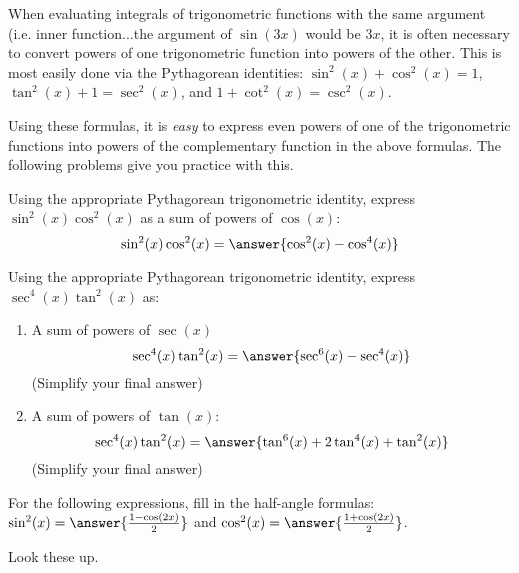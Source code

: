 \documentclass{ximera}
\begin{document}
\begin{problem}
  When evaluating integrals of trigonometric functions with the same argument (i.e. inner function...the argument of $\sin(3x)$ would be $3x$, it is often necessary to convert powers of one trigonometric function into powers of the other.
    This is most easily done via the Pythagorean identities: $\sin^2(x) + \cos^2(x) = 1$, $\tan^2(x) + 1 = \sec^2(x)$, and $1 + \cot^2(x) = \csc^2(x)$.
    
    Using these formulas, it is \emph{easy} to express even powers of one of the trigonometric functions into powers of the complementary function in the above formulas.
    The following problems give you practice with this.
  \begin{multipleChoice}
  \end{multipleChoice}
\end{problem}

\begin{problem}
  Using the appropriate Pythagorean trigonometric identity, express $\sin^2(x) \cos^2(x)$ as a sum of powers of $\cos(x)$:
  \[
    \sin^2(x) \cos^2(x) = \answer{\cos^2(x) - \cos^4(x)}
  \]
\end{problem}

\begin{problem}
  Using the appropriate Pythagorean trigonometric identity, express $\sec^4(x) \tan^2(x)$ as:
  \begin{enumerate}
    \item A sum of powers of $\sec(x)$
      \[
        \sec^4(x) \tan^2(x) = \answer{\sec^6(x) - \sec^4(x)}
      \]
      (Simplify your final answer)
    \item A sum of powers of $\tan(x)$:
      \[
        \sec^4(x) \tan^2(x) = \answer{\tan^6(x) + 2\tan^4(x) + \tan^2(x)}
      \]
      (Simplify your final answer)
  \end{enumerate}
\end{problem}

\begin{problem}
  For the following expressions, fill in the half-angle formulas:
  $\sin^2(x) = \answer{\frac{1 - \cos(2x)}{2}}$ and $\cos^2(x) = \answer{\frac{1 + \cos(2x)}{2}}$.  
  
  \begin{hint}
    Look these up.
  \end{hint}
\end{problem}
\end{document}
